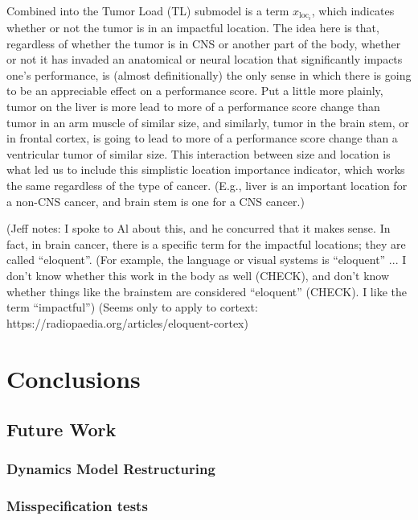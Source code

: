 \documentclass[twocolumn]{bmcart}%
\begin{document}
Combined into the Tumor Load (TL) submodel is a term
$x_{\text{loc}_i}$, which indicates whether or not the tumor is in an
impactful location. The idea here is that, regardless of whether the
tumor is in CNS or another part of the body, whether or not it has
invaded an anatomical or neural location that significantly impacts
one's performance, is (almost definitionally) the only sense in which
there is going to be an appreciable effect on a performance score. Put
a little more plainly, tumor on the liver is more lead to more of a
performance score change than tumor in an arm muscle of similar size,
and similarly, tumor in the brain stem, or in frontal cortex, is going
to lead to more of a performance score change than a ventricular tumor
of similar size. This interaction between size and location is what
led us to include this simplistic location importance indicator, which
works the same regardless of the type of cancer. (E.g., liver is an
important location for a non-CNS cancer, and brain stem is one for a
CNS cancer.)

(Jeff notes: I spoke to Al about this, and he concurred that it makes
sense. In fact, in brain cancer, there is a specific term for the
impactful locations; they are called ``eloquent''. (For example, the
language or visual systems is ``eloquent'' ... I don't know whether
this work in the body as well (CHECK), and don't know whether things
like the brainstem are considered ``eloquent'' (CHECK). I like the
term ``impactful'') \cite{DAgata2013} (Seems only to apply to cortext:
https://radiopaedia.org/articles/eloquent-cortex)

\section{Conclusions}\label{sec:conclusions}

\subsection{Future Work}\label{sec:futurework}

\subsubsection{Dynamics Model Restructuring}\label{sec:tests-misspecification}

\subsubsection{Misspecification tests}\label{sec:tests-misspecification}
\end{document}
